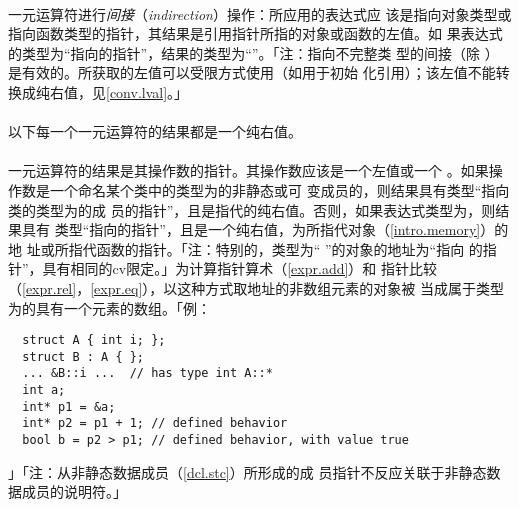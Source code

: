   \synprd[]{\tm{* \& + - ! \~}}

\paragraph{}
一元\tm{*}运算符进行\textit{间接}（\textit{indirection}）操作：所应用的表达式应
该是指向对象类型或指向函数类型的指针，其结果是引用指针所指的对象或函数的左值。如
果表达式的类型为``指向的指针''，结果的类型为``''。「注：指向不完整类
型的间接（除 ）是有效的。所获取的左值可以受限方式使用（如用于初始
化引用）；该左值不能转换成纯右值，见\ref{conv.lval}。」

\paragraph{}
以下每一个一元运算符的结果都是一个纯右值。

\paragraph{}
一元\tm{\&}运算符的结果是其操作数的指针。其操作数应该是一个左值或一个
。如果操作数是一个命名某个类中的类型为的非静态或可
变成员的，则结果具有类型``指向类的类型为的成
员的指针''，且是指代的纯右值。否则，如果表达式类型为，则结果具有
类型``指向的指针''，且是一个纯右值，为所指代对象（\ref{intro.memory}）的地
址或所指代函数的指针。「注：特别的，类型为`` ''的对象的地址为``指向
 的指针''，具有相同的cv限定。」为计算指针算术（\ref{expr.add}）和
指针比较（\ref{expr.rel}，\ref{expr.eq}），以这种方式取地址的非数组元素的对象被
当成属于类型为的具有一个元素的数组。「例：
\begin{lstlisting}
  struct A { int i; };
  struct B : A { };
  ... &B::i ...  // has type int A::*
  int a;
  int* p1 = &a;
  int* p2 = p1 + 1; // defined behavior
  bool b = p2 > p1; // defined behavior, with value true
\end{lstlisting}」「注：从非静态数据成员（\ref{dcl.stc}）所形成的成
员指针不反应关联于非静态数据成员的说明符。」


